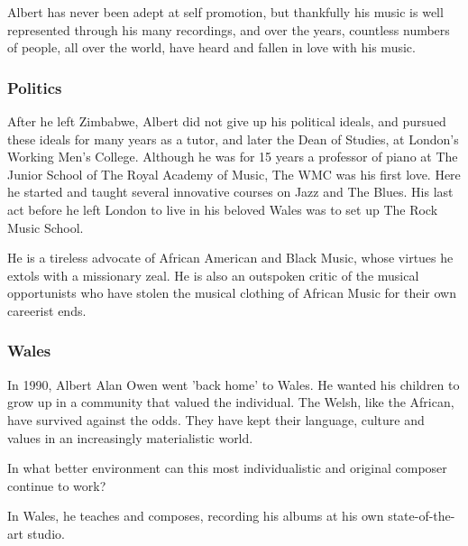 \documentclass{article}
\begin{document}
Albert has never been adept at self promotion, but thankfully his music is well represented through his many recordings, and over the years, countless numbers of people, all over the world, have heard and fallen in love with his music.

\subsubsection{Politics}

After he left Zimbabwe, Albert did not give up his political ideals, and pursued these ideals for many years as a tutor, and later the Dean of Studies, at London's Working Men's College.
Although he was for 15 years a professor of piano at The Junior School of The Royal Academy of Music, The WMC was his first love.
Here he started and taught several innovative courses on Jazz and The Blues.
His last act before he left London to live in his beloved Wales was to set up The Rock Music School.

He is a tireless advocate of African American and Black Music, whose virtues he extols with a missionary zeal.
He is also an outspoken critic of the musical opportunists who have stolen the musical clothing of African Music for their own careerist ends.

\subsubsection{Wales}

In 1990, Albert Alan Owen went 'back home' to Wales.
He wanted his children to grow up in a community that valued the individual.
The Welsh, like the African, have survived against the odds.
They have kept their language, culture and values in an increasingly materialistic world.

In what better environment can this most individualistic and original composer continue to work?

In Wales, he teaches and composes, recording his albums at his own state-of-the-art studio.
\end{document}
